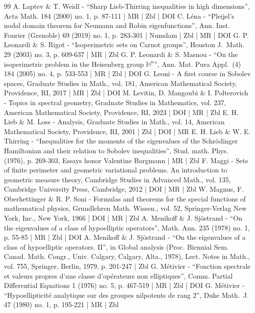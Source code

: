 \documentclass[10pt]{amsart}
\theoremstyle{definition}
\newcommand{\1}{\mathbbm{1}}
\begin{document}
\begin{thebibliography}{99}
A. Laptev \& T. Weidl - “Sharp Lieb-Thirring inequalities in high dimensions”, Acta Math. 184 (2000) no. 1, p. 87-111 | MR | Zbl | DOI
C. Léna - “Pleijel’s nodal domain theorem for Neumann and Robin eigenfunctions”, Ann. Inst. Fourier (Grenoble) 69 (2019) no. 1, p. 283-301 | Numdam | Zbl | MR | DOI
G. P. Leonardi \& S. Rigot - “Isoperimetric sets on Carnot groups”, Houston J. Math. 29 (2003) no. 3, p. 609-637 | MR | Zbl
G. P. Leonardi \& S. Masnou - “On the isoperimetric problem in the Heisenberg group ${\mathbb{H}}^n$”, Ann. Mat. Pura Appl. (4) 184 (2005) no. 4, p. 533-553 | MR | Zbl | DOI
G. Leoni - A first course in Sobolev spaces, Graduate Studies in Math., vol. 181, American Mathematical Society, Providence, RI, 2017 | MR | Zbl | DOI
M. Levitin, D. Mangoubi \& I. Polterovich - Topics in spectral geometry, Graduate Studies in Mathematics, vol. 237, American Mathematical Society, Providence, RI, 2023 | DOI | MR | Zbl
E. H. Lieb \& M. Loss - Analysis, Graduate Studies in Math., vol. 14, American Mathematical Society, Providence, RI, 2001 | Zbl | DOI | MR
E. H. Lieb \& W. E. Thirring - “Inequalities for the moments of the eigenvalues of the Schrödinger Hamiltonian and their relation to Sobolev inequalities”, Stud. math. Phys. (1976), p. 269-303, Essays honor Valentine Bargmann | MR | Zbl
F. Maggi - Sets of finite perimeter and geometric variational problems. An introduction to geometric measure theory, Cambridge Studies in Advanced Math., vol. 135, Cambridge University Press, Cambridge, 2012 | DOI | MR | Zbl
W. Magnus, F. Oberhettinger \& R. P. Soni - Formulas and theorems for the special functions of mathematical physics, Grundlehren Math. Wissen., vol. 52, Springer-Verlag New York, Inc., New York, 1966 | DOI | MR | Zbl
A. Menikoff \& J. Sjöstrand - “On the eigenvalues of a class of hypoelliptic operators”, Math. Ann. 235 (1978) no. 1, p. 55-85 | MR | Zbl | DOI
A. Menikoff \& J. Sjöstrand - “On the eigenvalues of a class of hypoelliptic operators. II”, in Global analysis (Proc. Biennial Sem. Canad. Math. Congr., Univ. Calgary, Calgary, Alta., 1978), Lect. Notes in Math., vol. 755, Springer, Berlin, 1979, p. 201-247 | Zbl
G. Métivier - “Fonction spectrale et valeurs propres d’une classe d’opérateurs non elliptiques”, Comm. Partial Differential Equations 1 (1976) no. 5, p. 467-519 | MR | Zbl | DOI
G. Métivier - “Hypoellipticité analytique sur des groupes nilpotents de rang $2$”, Duke Math. J. 47 (1980) no. 1, p. 195-221 | MR | Zbl

\end{thebibliography}
\end{document}
